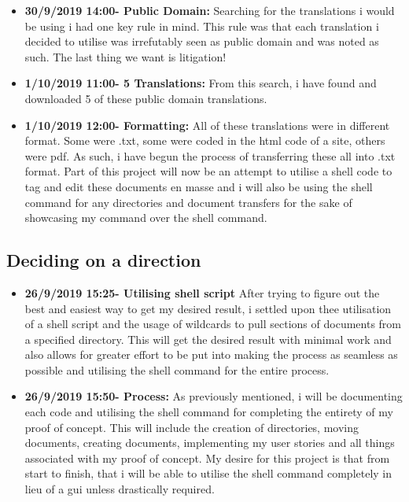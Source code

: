 \documentclass{article}
\begin{document}
\begin{itemize}

\item{\textbf{ 30/9/2019 14:00- Public Domain:} Searching for the translations i would be using i had one key rule in mind. This rule was that each translation i decided to utilise was irrefutably seen as public domain and was noted as such. The last thing we want is litigation!}

\item{\textbf{1/10/2019 11:00- 5 Translations:} From this search, i have found and downloaded 5 of these public domain translations.}

\item{\textbf{1/10/2019 12:00- Formatting:} All of these translations were in different format. Some were .txt, some were coded in the html code of a site, others were pdf. As such, i have begun the process of transferring these all into .txt format. Part of this project will now be an attempt to utilise a shell code to tag and edit these documents en masse and i will also be using the shell command for any directories and document transfers for the sake of showcasing my command over the shell command.}
 
\end{itemize}

\subsection{Deciding on a direction}
\begin{itemize}
\item{\textbf{26/9/2019 15:25- Utilising shell script} After trying to figure out the best and easiest way to get my desired result, i settled upon thee utilisation of a shell script and the usage of wildcards to pull sections of documents from a specified directory. This will get the desired result with minimal work and also allows for greater effort to be put into making the process as seamless as possible and utilising the shell command for the entire process.}

\item{\textbf{26/9/2019 15:50- Process:} As previously mentioned, i will be documenting each code and utilising the shell command for completing the entirety of my proof of concept. This will include the creation of directories, moving documents, creating documents, implementing my user stories and all things associated with my proof of concept. My desire for this project is that from start to finish, that i will be able to utilise the shell command completely in lieu of a gui unless drastically required.  }
\end{itemize}
\end{document}
